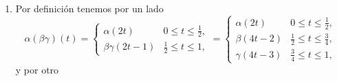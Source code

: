 \documentclass[bibtex, anon]{TEMat-article}
\begin{document}
\begin{demostracion}\
	\begin{enumerate}
		\item Por definición tenemos por un lado $$\alpha(\beta\gamma)(t)=\left\{\begin{array}{lc}
		\alpha(2t) & 0\leq t\leq\frac{1}{2},\\
		\beta\gamma(2t-1) & \frac{1}{2}\leq t\leq 1,
		\end{array}\right.=\left\{\begin{array}{lc}
		\alpha(2t) & 0\leq t\leq\frac{1}{2},\\
		\beta(4t-2) & \frac{1}{2}\leq t\leq\frac{3}{4},\\
		\gamma(4t-3) & \frac{3}{4}\leq t\leq 1,
		\end{array}\right.$$
		y por otro 
		

\end{enumerate}
\end{demostracion}
\end{document}
